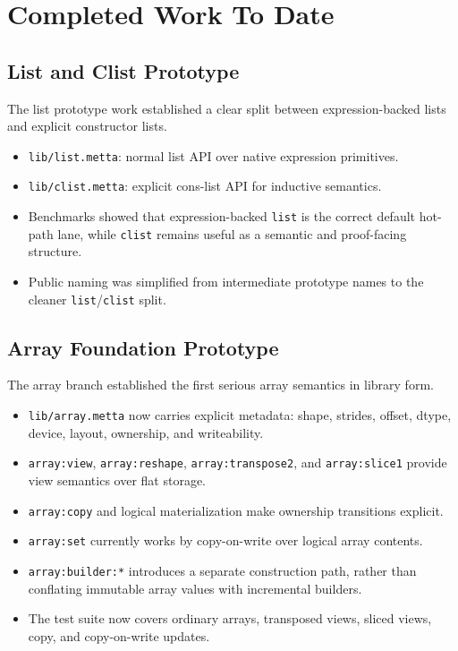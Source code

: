 \documentclass[11pt]{article}
\begin{document}
\section{Completed Work To Date}
\subsection{List and Clist Prototype}
The list prototype work established a clear split between expression-backed lists and explicit constructor lists.
\begin{itemize}
  \item \texttt{lib/list.metta}: normal list API over native expression primitives.
  \item \texttt{lib/clist.metta}: explicit cons-list API for inductive semantics.
  \item Benchmarks showed that expression-backed \texttt{list} is the correct default hot-path lane, while \texttt{clist} remains useful as a semantic and proof-facing structure.
  \item Public naming was simplified from intermediate prototype names to the cleaner \texttt{list}/\texttt{clist} split.
\end{itemize}

\subsection{Array Foundation Prototype}
The array branch established the first serious array semantics in library form.
\begin{itemize}
  \item \texttt{lib/array.metta} now carries explicit metadata: shape, strides, offset, dtype, device, layout, ownership, and writeability.
  \item \texttt{array:view}, \texttt{array:reshape}, \texttt{array:transpose2}, and \texttt{array:slice1} provide view semantics over flat storage.
  \item \texttt{array:copy} and logical materialization make ownership transitions explicit.
  \item \texttt{array:set} currently works by copy-on-write over logical array contents.
  \item \texttt{array:builder:*} introduces a separate construction path, rather than conflating immutable array values with incremental builders.
  \item The test suite now covers ordinary arrays, transposed views, sliced views, copy, and copy-on-write updates.
\end{itemize}
\end{document}
